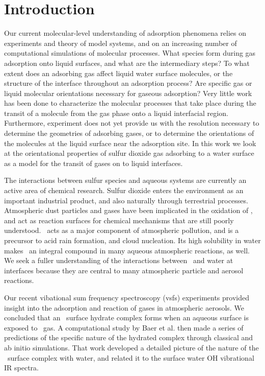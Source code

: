 \section{Introduction}

Our current molecular-level understanding of adsorption phenomena relies on experiments and theory of model systems, and on an increasing number of computational simulations of molecular processes. What species form during gas adsorption onto liquid surfaces, and what are the intermediary steps? To what extent does an adsorbing gas affect liquid water surface molecules, or the structure of the interface throughout an adsorption process? Are specific gas or liquid molecular orientations necessary for gaseous adsorption? Very little work has been done to characterize the molecular processes that take place during the transit of a molecule from the gas phase onto a liquid interfacial region. Furthermore, experiment does not yet provide us with the resolution necessary to determine the geometries of adsorbing gases, or to determine the orientations of the molecules at the liquid surface near the adsorption site. In this work we look at the orientational properties of sulfur dioxide gas adsorbing to a water surface as a model for the transit of gases on to liquid interfaces.

The interactions between sulfur species and aqueous systems are currently an active area of chemical research. Sulfur dioxide enters the environment as an important industrial product, and also naturally through terrestrial processes. Atmospheric dust particles and gases have been implicated in the oxidation of \suldiox, and act as reaction surfaces for chemical mechanisms that are still poorly understood.\cite{Baltrusaitis2011,Rubasinghege2010,Li2007} \suldiox~acts as a major component of atmospheric pollution, and is a precursor to acid rain formation, and cloud nucleation. Its high solubility in water makes \suldiox~an integral compound in many aqueous atmospheric reactions, as well. We seek a fuller understanding of the interactions between \suldiox~and water at interfaces because they are central to many atmospheric particle and aerosol reactions.

Our recent vibational sum frequency spectroscopy (vsfs) experiments provided insight into the adsorption and reaction of gases in atmospheric aerosols.\cite{Tarbuck2005,Tarbuck2006} We concluded that an \suldiox~surface hydrate complex forms when an aqueous surface is exposed to \suldiox~gas. A computational study by Baer et al.\cite{Baer2010} then made a series of predictions of the specific nature of the hydrated complex through classical and ab initio simulations. That work developed a detailed picture of the nature of the \suldiox~surface complex with water, and related it to the surface water OH vibrational IR spectra.

